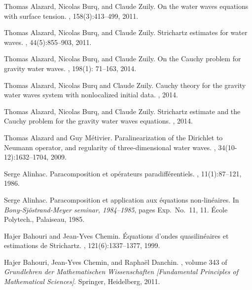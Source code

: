 \documentclass[11pt,english]{smfart}
\theoremstyle{plain}
\theoremstyle{definition}
\numberwithin{equation}{section}
\begin{document}
\begin{thebibliography}{10}
\small

Thomas Alazard, Nicolas Burq, and Claude Zuily.
\newblock On the water waves equations with surface tension.
, 158(3):413--499, 2011.

Thomas Alazard, Nicolas Burq, and Claude Zuily.
\newblock Strichartz estimates for water waves.
, 44(5):855--903, 2011.

Thomas Alazard, Nicolas Burq, and Claude Zuily.
\newblock On the Cauchy problem for gravity water waves.
, 198(1): 71--163, 2014.

Thomas Alazard, Nicolas Burq and Claude Zuily. 
\newblock Cauchy theory for the gravity water waves system with nonlocalized initial data.
, 2014.

Thomas Alazard, Nicolas Burq, and Claude Zuily.
\newblock Strichartz estimate and the Cauchy problem for the gravity water waves equations.
, 2014.

Thomas Alazard and Guy M{\'e}tivier.
\newblock Paralinearization of the {D}irichlet to {N}eumann operator, and
  regularity of three-dimensional water waves.
, 34(10-12):1632--1704,
  2009.

Serge Alinhac.
\newblock Paracomposition et op\'erateurs paradiff\'erentiels.
, 11(1):87--121, 1986.

Serge Alinhac.
\newblock Paracomposition et application aux \'equations non-lin\'eaires.
\newblock In {\em Bony-{S}j\"ostrand-{M}eyer seminar, 1984--1985}, pages Exp.\
  No.\ 11, 11. \'Ecole Polytech., Palaiseau, 1985.

Hajer Bahouri and Jean-Yves Chemin.
\newblock \'{E}quations d'ondes quasilin\'eaires et estimations de
  {S}trichartz.
, 121(6):1337--1377, 1999.

Hajer Bahouri, Jean-Yves Chemin, and Rapha{\"e}l Danchin.
,
  volume 343 of {\em Grundlehren der Mathematischen Wissenschaften [Fundamental
  Principles of Mathematical Sciences]}.
\newblock Springer, Heidelberg, 2011.


\end{thebibliography}
\end{document}
